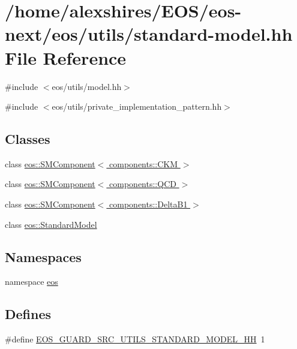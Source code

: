 \hypertarget{standard-model_8hh}{
\section{/home/alexshires/EOS/eos-\/next/eos/utils/standard-\/model.hh File Reference}
\label{standard-model_8hh}
}
{\ttfamily \#include $<$eos/utils/model.hh$>$}\par
{\ttfamily \#include $<$eos/utils/private\_\-implementation\_\-pattern.hh$>$}\par
\subsection*{Classes}
\begin{DoxyCompactItemize}
\item 
class \hyperlink{classeos_1_1SMComponent_3_01components_1_1CKM_01_4}{eos::SMComponent$<$ components::CKM $>$}
\item 
class \hyperlink{classeos_1_1SMComponent_3_01components_1_1QCD_01_4}{eos::SMComponent$<$ components::QCD $>$}
\item 
class \hyperlink{classeos_1_1SMComponent_3_01components_1_1DeltaB1_01_4}{eos::SMComponent$<$ components::DeltaB1 $>$}
\item 
class \hyperlink{classeos_1_1StandardModel}{eos::StandardModel}
\end{DoxyCompactItemize}
\subsection*{Namespaces}
\begin{DoxyCompactItemize}
\item 
namespace \hyperlink{namespaceeos}{eos}
\end{DoxyCompactItemize}
\subsection*{Defines}
\begin{DoxyCompactItemize}
\item 
\#define \hyperlink{standard-model_8hh_a0c02f85a1317b76d20ec8cf296dd1d26}{EOS\_\-GUARD\_\-SRC\_\-UTILS\_\-STANDARD\_\-MODEL\_\-HH}~1
\end{DoxyCompactItemize}


